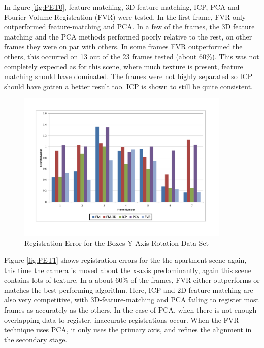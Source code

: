 In figure \ref{fig:PET0}, feature-matching, 3D-feature-matching, ICP, PCA and Fourier Volume Registration (FVR) were tested. In the first frame, FVR only outperformed feature-matching and PCA. In a few of the frames, the 3D feature matching and the PCA methods performed poorly relative to the rest, on other frames they were on par with others. In some frames FVR outperformed the others, this occurred on 13 out of the 23 frames tested (about 60\%). This was not completely expected as for this scene, where much texture is present, feature matching should have dominated. The frames were not highly separated so ICP should have gotten a better result too. ICP is shown to still be quite consistent. \\

\begin{figure}[!htb]
\centering
\includegraphics[width=4.0in]{images/results/Boxes_Texture_Rotate}
\caption{Registration Error for the Boxes Y-Axis Rotation Data Set}
\label{fig:PET2}
\end{figure}

Figure \ref{fig:PET1} shows registration errors for the the apartment scene again, this time the camera is moved about the x-axis predominantly, again this scene contains lots of texture. In a about 60\% of the frames, FVR either outperforms or matches the best performing algorithm. Here, ICP and 2D-feature matching are also very competitive, with 3D-feature-matching and PCA failing to register most frames as accurately as the others. In the case of PCA, when there is not enough overlapping data to register, inaccurate registrations occur. When the FVR technique uses PCA, it only uses the primary axis, and refines the alignment in the secondary stage. \\

